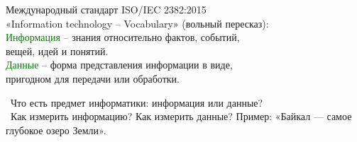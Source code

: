 \newpage
\rhead{\textbf{\textcolor{blue}{Т}\textcolor{gray}{ерминология: Информация и данные}}}

\vskip 0.5cm

\newline
\begin{flushleft}
 Международный стандарт ISO/IEC 2382:2015\\
«Information technology – Vocabulary» (вольный пересказ):\\
\qquad \textcolor{Green}
{Информация} – знания относительно фактов, событий, \\ \qquad вещей, идей и  понятий.
\\
		\qquad \textcolor{Green}{Данные} – форма представления информации в виде, \\ \qquad пригодном для передачи или обработки. \\
\end{flushleft}
	\vspace*{3mm}
	\textbullet \ Что есть предмет информатики: информация или данные? \\
	\textbullet \ Как измерить информацию? Как измерить данные? 	Пример: «Байкал — самое глубокое озеро Земли».